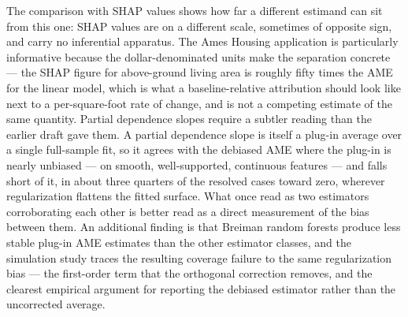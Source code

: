 \documentclass[12pt]{article}
\begin{document}
	The comparison with SHAP values shows how far a different estimand can sit from this
	one: SHAP values are on a different scale, sometimes of opposite sign, and
	carry no inferential apparatus. The Ames Housing application is particularly
	informative because the dollar-denominated units make the separation concrete ---
	the SHAP figure for above-ground living area is roughly fifty times the AME for
	the linear model, which is what a baseline-relative attribution should look like
	next to a per-square-foot rate of change, and is not a competing estimate of the
	same quantity. Partial dependence slopes require a subtler reading than the
	earlier draft gave them. A partial dependence slope is itself a plug-in average
	over a single full-sample fit, so it agrees with the debiased AME where the
	plug-in is nearly unbiased --- on smooth, well-supported, continuous features ---
	and falls short of it, in about three quarters of the resolved cases toward zero,
	wherever regularization flattens the fitted surface. What once read as two
	estimators corroborating each other is better read as a direct measurement of the
	bias between them. An
	additional finding is that Breiman random forests produce less stable plug-in AME
	estimates than the other estimator classes, and the simulation study traces the
	resulting coverage failure to the same regularization bias --- the first-order term
	that the orthogonal correction removes, and the clearest empirical argument for
	reporting the debiased estimator rather than the uncorrected average.
	
\end{document}

